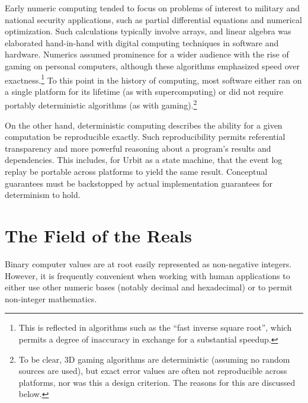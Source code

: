 \documentclass[twoside]{article}
\begin{document}
Early numeric computing tended to focus on problems of interest to military and national security applications, such as partial differential equations and numerical optimization.  Such calculations typically involve arrays, and linear algebra was elaborated hand-in-hand with digital computing techniques in software and hardware.  Numerics assumed prominence for a wider audience with the rise of gaming on personal computers, although these algorithms emphasized speed over exactness.\footnote{This is reflected in algorithms such as the “fast inverse square root”, which permits a degree of inaccuracy in exchange for a substantial speedup.}  To this point in the history of computing, most software either ran on a single platform for its lifetime (as with supercomputing) or did not require portably deterministic algorithms (as with gaming).\footnote{To be clear, 3D gaming algorithms are deterministic (assuming no random sources are used), but exact error values are often not reproducible across platforms, nor was this a design criterion.  The reasons for this are discussed below.}

On the other hand, deterministic computing describes the ability for a given computation be reproducible exactly.  Such reproducibility permits referential transparency and more powerful reasoning about a program's results and dependencies.  This includes, for Urbit as a state machine, that the event log replay be portable across platforms to yield the same result.  Conceptual guarantees must be backstopped by actual implementation guarantees for determinism to hold.

\section{The Field of the Reals}

Binary computer values are at root easily represented as non-negative integers.  However, it is frequently convenient when working with human applications to either use other numeric bases (notably decimal and hexadecimal) or to permit non-integer mathematics.
\end{document}
